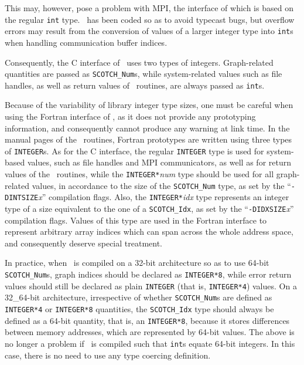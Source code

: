 This may, however, pose a problem with MPI, the interface of which is
based on the regular {\tt int} type. \ptscotch\ has been coded so
as to avoid typecast bugs, but overflow errors may result from the
conversion of values of a larger integer type into {\tt int}s when
handling communication buffer indices.

Consequently, the C interface of \scotch\ uses two types of integers.
Graph-related quantities are passed as {\tt SCOTCH\_\lbt Num}s,
while system-related values such as file handles, as well as
return values of \libscotch\ routines, are always passed as
{\tt int}s.

Because of the variability of library integer type sizes, one must be
careful when using the Fortran interface of \scotch, as it does not
provide any prototyping information, and consequently cannot produce
any warning at link time. In the manual pages of the
\libscotch\ routines, Fortran prototypes are written using three types
of {\tt INTEGER}s. As for the C interface, the regular {\tt INTEGER}
type is used for system-based values, such as file handles and MPI
communicators, as well as for return values of the
\libscotch\ routines, while the {\tt INTEGER*}{\it num} type
should be used for all graph-related values, in accordance to the size
of the {\tt SCOTCH\_\lbt Num} type, as set by the
``{\tt -DINTSIZE}{\it x}'' compilation flags. Also, the
{\tt INTEGER*}{\it idx} type represents an integer type of a size
equivalent to the one of a {\tt SCOTCH\_\lbt Idx}, as set by the
``{\tt -DIDXSIZE}{\it x}'' compilation flags. Values of this type are
used in the Fortran interface to represent arbitrary array indices
which can span across the whole address space, and consequently
deserve special treatment.

In practice, when \scotch\ is compiled on a 32-bit architecture so as
to use 64-bit {\tt SCOTCH\_\lbt Num}s, graph indices should be
declared as {\tt INTEGER*8}, while error return values
should still be declared as plain {\tt INTEGER} (that is,
{\tt INTEGER*4}) values. On a 32\_64-bit architecture, irrespective of
whether {\tt SCOTCH\_\lbt Num}s are defined as {\tt INTEGER*4}
or {\tt INTEGER*8} quantities, the {\tt SCOTCH\_\lbt Idx} type
should always be defined as a 64-bit quantity, that is, an
{\tt INTEGER*8}, because it stores differences between memory
addresses, which are represented by 64-bit values.
The above is no longer a problem if \scotch\ is compiled such that
{\tt int}s equate 64-bit integers. In this case, there is no need to
use any type coercing definition.
\\

